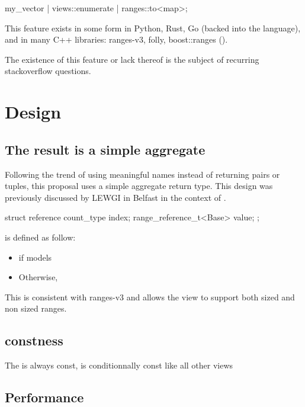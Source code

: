 \documentclass{wg21}
\begin{document}
\begin{colorblock}
my_vector | views::enumerate | ranges::to<map>;
\end{colorblock}

This feature exists in some form in Python, Rust, Go (backed into the language), and in many C++ libraries: ranges-v3, folly, boost::ranges ().


The existence of this feature or lack thereof is the subject of recurring stackoverflow questions.  


\section{Design}

\subsection{The result is a simple aggregate}

Following the trend of using meaningful names instead of returning pairs or tuples, this proposal uses a simple aggregate return type.
This design was previously discussed by LEWGI in Belfast in the context of .

\begin{colorblock}

struct reference {
    count_type index;
    range_reference_t<Base> value;
};
\end{colorblock}

 is defined as follow:
\begin{itemize}
    \item {} if  models 
    \item Otherwise, 
\end{itemize}

This is consistent with ranges-v3 and allows the view to support both sized and non sized ranges.

\subsection{constness}

The  is always const,  is conditionnally const like all other views

\subsection{Performance}
\end{document}
